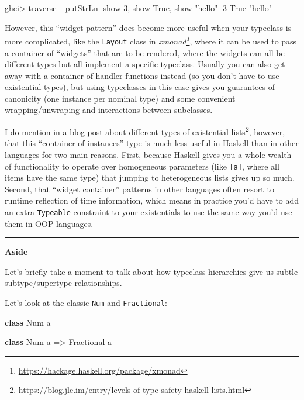 \documentclass[]{article}
\newenvironment{Shaded}{}{}
\newcommand{\DataTypeTok}[1]{\textcolor[rgb]{0.56,0.13,0.00}{#1}}
\newcommand{\DecValTok}[1]{\textcolor[rgb]{0.25,0.63,0.44}{#1}}
\newcommand{\FunctionTok}[1]{\textcolor[rgb]{0.02,0.16,0.49}{#1}}
\newcommand{\KeywordTok}[1]{\textcolor[rgb]{0.00,0.44,0.13}{\textbf{#1}}}
\newcommand{\NormalTok}[1]{#1}
\newcommand{\OperatorTok}[1]{\textcolor[rgb]{0.40,0.40,0.40}{#1}}
\newcommand{\OtherTok}[1]{\textcolor[rgb]{0.00,0.44,0.13}{#1}}
\newcommand{\StringTok}[1]{\textcolor[rgb]{0.25,0.44,0.63}{#1}}
\renewcommand{\href}[2]{#2\footnote{\url{#1}}}
\begin{document}
\begin{Shaded}
\begin{Highlighting}[]
\NormalTok{ghci}\OperatorTok{\textgreater{}}\NormalTok{ traverse\_ }\FunctionTok{putStrLn}\NormalTok{ [}\FunctionTok{show} \DecValTok{3}\NormalTok{, }\FunctionTok{show} \DataTypeTok{True}\NormalTok{, }\FunctionTok{show} \StringTok{"hello"}\NormalTok{]}
\DecValTok{3}
\DataTypeTok{True}
\StringTok{"hello"}
\end{Highlighting}
\end{Shaded}

However, this ``widget pattern'' does become more useful when your typeclass is
more complicated, like the \texttt{Layout} class in
\emph{\href{https://hackage.haskell.org/package/xmonad}{xmonad}}, where it can
be used to pass a container of ``widgets'' that are to be rendered, where the
widgets can all be different types but all implement a specific typeclass.
Usually you can also get away with a container of handler functions instead (so
you don't have to use existential types), but using typeclasses in this case
gives you guarantees of canonicity (one instance per nominal type) and some
convenient wrapping/unwraping and interactions between subclasses.

I do mention in
\href{https://blog.jle.im/entry/levels-of-type-safety-haskell-lists.html}{a blog
post about different types of existential lists}, however, that this ``container
of instances'' type is much less useful in Haskell than in other languages for
two main reasons. First, because Haskell gives you a whole wealth of
functionality to operate over homogeneous parameters (like \texttt{{[}a{]}},
where all items have the same type) that jumping to heterogeneous lists gives up
so much. Second, that ``widget container'' patterns in other languages often
resort to runtime reflection of time information, which means in practice you'd
have to add an extra \texttt{Typeable} constraint to your existentials to use
the same way you'd use them in OOP languages.

\begin{center}\rule{0.5\linewidth}{0.5pt}\end{center}

\textbf{Aside}

Let's briefly take a moment to talk about how typeclass hierarchies give us
subtle subtype/supertype relationships.

Let's look at the classic \texttt{Num} and \texttt{Fractional}:

\begin{Shaded}
\begin{Highlighting}[]
\KeywordTok{class} \DataTypeTok{Num}\NormalTok{ a}

\KeywordTok{class} \DataTypeTok{Num}\NormalTok{ a }\OtherTok{=\textgreater{}} \DataTypeTok{Fractional}\NormalTok{ a}
\end{Highlighting}
\end{Shaded}
\end{document}
